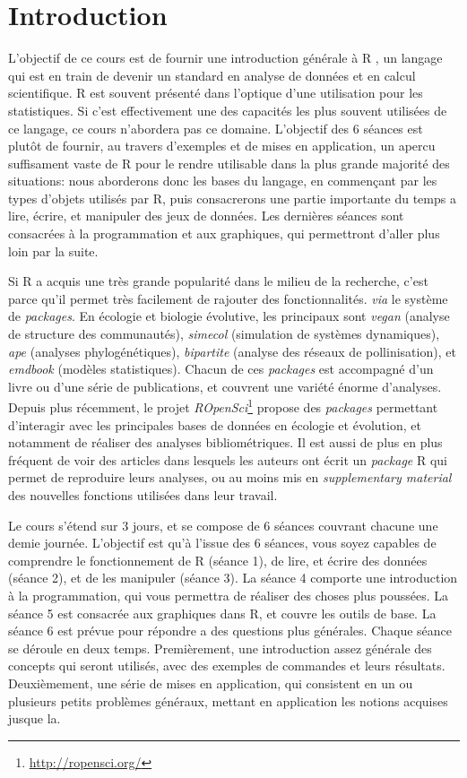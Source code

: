 \chapter{Introduction}

L'objectif de ce cours est de fournir une introduction générale à R \parencite{R-Development-Core-Team2008}, un langage qui est en train de devenir un standard en analyse de données et en calcul scientifique.
R est souvent présenté dans l'optique d'une utilisation pour les statistiques.
Si c'est effectivement une des capacités les plus souvent utilisées de ce langage, ce cours n'abordera pas ce domaine.
L'objectif des 6 séances est plutôt de fournir, au travers d'exemples et de mises en application, un apercu suffisament vaste de R pour le rendre utilisable dans la plus grande majorité des situations:
nous aborderons donc les bases du langage, en commençant par les types d'objets utilisés par R, puis consacrerons une partie importante du temps a lire, écrire, et manipuler des jeux de données.
Les dernières séances sont consacrées à la programmation et aux graphiques, qui permettront d'aller plus loin par la suite.

Si R a acquis une très grande popularité dans le milieu de la recherche, c'est parce qu'il permet très facilement de rajouter des fonctionnalités. \emph{via} le système de \emph{packages}.
En écologie et biologie évolutive, les principaux sont \emph{vegan} (analyse de structure des communautés), \emph{simecol} (simulation de systèmes dynamiques), \emph{ape} (analyses phylogénétiques), \emph{bipartite} (analyse des réseaux de pollinisation), et \emph{emdbook} (modèles statistiques).
Chacun de ces \emph{packages} est accompagné d'un livre ou d'une série de publications, et couvrent une variété énorme d'analyses.
Depuis plus récemment, le projet \emph{ROpenSci}\footnote{\url{http://ropensci.org/}} propose des \emph{packages} permettant d'interagir avec les principales bases de données en écologie et évolution, et notamment de réaliser des analyses bibliométriques.
Il est aussi de plus en plus fréquent de voir des articles dans lesquels les auteurs ont écrit un \emph{package} R qui permet de reproduire leurs analyses, ou au moins mis en \emph{supplementary material} des nouvelles fonctions utilisées dans leur travail.  

Le cours s'étend sur 3 jours, et se compose de 6 séances couvrant chacune une demie journée.
L'objectif est qu'à l'issue des 6 séances, vous soyez capables de comprendre le fonctionnement de R (séance 1), de lire, et écrire des données (séance 2), et de les manipuler (séance 3).
La séance 4 comporte une introduction à la programmation, qui vous permettra de réaliser des choses plus poussées.
La séance 5 est consacrée aux graphiques dans R, et couvre les outils de base.
La séance 6 est prévue pour répondre a des questions plus générales.
Chaque séance se déroule en deux temps.
Premièrement, une introduction assez générale des concepts qui seront utilisés, avec des exemples de commandes et leurs résultats.
Deuxièmement, une série de mises en application, qui consistent en un ou plusieurs petits problèmes généraux, mettant en application les notions acquises jusque la. 

